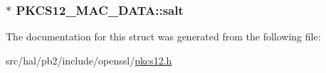 \subsubsection[{\texorpdfstring{salt}{salt}}]{$\ast$ P\+K\+C\+S12\+\_\+\+M\+A\+C\+\_\+\+D\+A\+T\+A\+::salt}\hypertarget{struct_p_k_c_s12___m_a_c___d_a_t_a_aa20b01b05e8dc10b03a8f49a1c683559}{}\label{struct_p_k_c_s12___m_a_c___d_a_t_a_aa20b01b05e8dc10b03a8f49a1c683559}


The documentation for this struct was generated from the following file\+:\begin{DoxyCompactItemize}
\item 
src/hal/pb2/include/openssl/\hyperlink{pkcs12_8h}{pkcs12.\+h}\end{DoxyCompactItemize}
